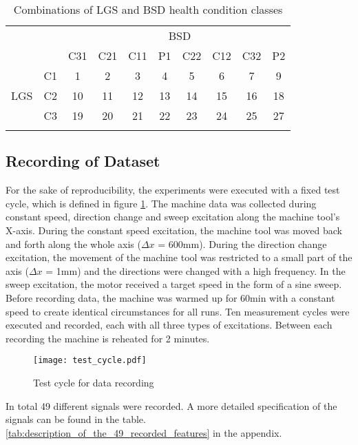 \begin{center}
\begin{longtable}{c c c c c c c c c c} 
\toprule
  &  &    &     &     &     \multicolumn{2}{c}{BSD}     &     &     &    \\ 
  &  & C31 & C21 & C11 & P1  & C22 & C12 & C32 & P2 \\ 
\midrule
     & \multicolumn{1}{c|}{C1} & 1 & 2 & 3 & 4 & 5 & 6 & 7 & 9 \\ 
 LGS & \multicolumn{1}{c|}{C2}& 10 & 11 & 12 & 13 & 14 & 15 & 16 & 18 \\  
     & \multicolumn{1}{c|}{C3} & 19 & 20 & 21 & 22 & 23 & 24 & 25 & 27 \\ 
\bottomrule
\caption {Combinations of LGS and BSD health condition classes}
\label {tab:recorded_combinations_of_LGS_and_BSD_health_conditions}
\end{longtable}
\end{center}


\subsection{Recording of Dataset}
For the sake of reproducibility, the experiments were executed with a fixed test cycle, which is defined in figure \ref{fig:test_cycle}. The machine data was collected during constant speed, direction change and sweep excitation along the machine tool's X-axis. During the constant speed excitation, the machine tool was moved back and forth along the whole axis ($\Delta x$ = 600mm). During the direction change excitation, the movement of the machine tool was restricted to a small part of the axis ($\Delta x$ = 1mm) and the directions were changed with a high frequency. In the sweep excitation, the motor received a target speed in the form of a sine sweep. Before recording data, the machine was warmed up for 60min with a constant speed to create identical circumstances for all runs. Ten measurement cycles were executed and recorded, each with all three types of excitations. Between each recording the machine is reheated for 2 minutes. 

\begin{figure}[H]
  \centering
  \texttt{[image: test\_cycle.pdf]}
  \caption {Test cycle for data recording}
  \label{fig:test_cycle}
\end{figure}

In total 49 different signals were recorded. A more detailed specification of the signals can be found in the table. \ref{tab:description_of_the_49_recorded_features} in the appendix.

